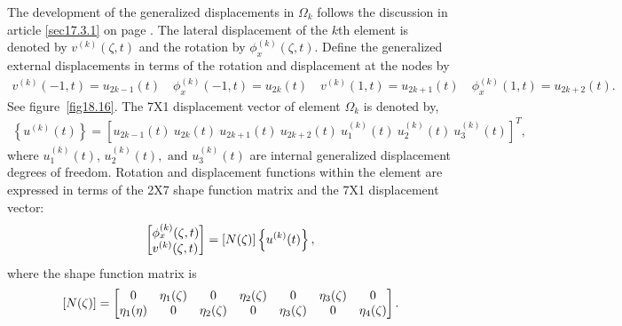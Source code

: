 \documentclass{AeroStructure-ERJohnson}
\begin{document}
The development of the generalized displacements in $\Omega_k$ follows the discussion in article \ref{sec17.3.1} on page \pageref{sec17.3.1}. The lateral displacement of the $k$th element is denoted by $v^{(k)}(\zeta, t)$ and the rotation by $\phi_{x}^{(k)}(\zeta, t)$. Define the generalized external displacements in terms of the rotation and displacement at the nodes by
\begin{align}\label{eq18.139}
v^{(k)}(-1, t)=u_{2 k-1}(t) \quad \phi_{x}^{(k)}(-1, t)=u_{2 k}(t) \quad v^{(k)}(1, t)=u_{2 k+1}(t) \quad \phi_{x}^{(k)}(1, t)=u_{2 k+2}(t).
\end{align}
See figure~\ref{fig18.16}. The 7X1 displacement vector of element $\Omega_k$ is denoted by,
{\def\thefigure{18.16}
}
\begin{align}\label{eq18.140}
\left\{u^{(k)}(t)\right\}=\left[u_{2 k-1}(t)~u_{2 k}(t)~u_{2 k+1}(t)~u_{2 k+2}(t)~u_{1}^{(k)}(t)~u_{2}^{(k)}(t)~u_{3}^{(k)}(t)\right]^{T},
\end{align}
where $u_{1}^{(k)}(t)$, $u_{2}^{(k)}(t),\text{ and }u_{3}^{(k)}(t)$ are internal generalized displacement degrees of freedom. Rotation and displacement functions within the element are expressed in terms of the 2X7 shape function matrix and the 7X1 displacement vector:
\begin{align}\label{eq18.141}
\left[\begin{array}{@{}l@{}}\phi_{x}^{(k)}(\zeta, t) \\v^{(k)}(\zeta, t)\end{array}\right]=[N(\zeta)]\left\{u^{(k)}(t)\right\},
\end{align}
where the shape function matrix is
\begin{align}\label{eq18.142}
[N(\zeta)]=\left[\begin{array}{@{}ccccccc@{}}0 & \eta_{1}(\zeta) & 0 & \eta_{2}(\zeta) & 0 & \eta_{3}(\zeta) & 0 \\\eta_{1}(\eta) & 0 & \eta_{2}(\zeta) & 0 & \eta_{3}(\zeta) & 0 & \eta_{4}(\zeta)\end{array}\right].
\end{align}
\end{document}
